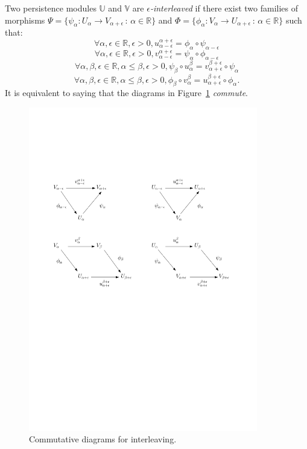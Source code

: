 \begin{defin} 
Two persistence modules $\mathbb{U}$ and $\mathbb{V}$ are \textit{$\epsilon$-interleaved} if there 
exist two families of morphisms $\Psi=\{\psi_{\alpha}:U_{\alpha}\rightarrow V_{\alpha+\epsilon}\,:\, \alpha\in\mathbb{R}\}$ 
and $\Phi=\{\phi_{\alpha}:V_{\alpha}\rightarrow U_{\alpha+\epsilon}\, :\, \alpha\in\mathbb{R}\}$ such that: 
$$\forall\alpha,\epsilon\in\mathbb{R},\epsilon>0,u_{\alpha-\epsilon}^{\alpha+\epsilon}=\phi_{\alpha}\circ\psi_{\alpha-\epsilon}$$ 
$$\forall\alpha,\epsilon\in\mathbb{R},\epsilon>0,v_{\alpha-\epsilon}^{\alpha+\epsilon}=\psi_{\alpha}\circ\phi_{\alpha-\epsilon}$$ 
$$\forall\alpha,\beta,\epsilon\in\mathbb{R},\alpha\leq\beta,\epsilon>0,\psi_{\beta}\circ u_{\alpha}^{\beta}=v_{\alpha+\epsilon}^{\beta+\epsilon}\circ\psi_{\alpha}$$ 
$$\forall\alpha,\beta,\epsilon\in\mathbb{R},\alpha\leq\beta,\epsilon>0,\phi_{\beta}\circ v_{\alpha}^{\beta}=u_{\alpha+\epsilon}^{\beta+\epsilon}\circ\phi_{\alpha}.$$ 
It is equivalent to saying that the diagrams in Figure~\ref{fig:comm} \textit{commute}. 
\end{defin}

\begin{figure}[h] \centering 
\includegraphics[width = 10cm]{figures/CommutativeDiagrams} \caption{\label{fig:comm}Commutative diagrams for interleaving.} 
\end{figure}

